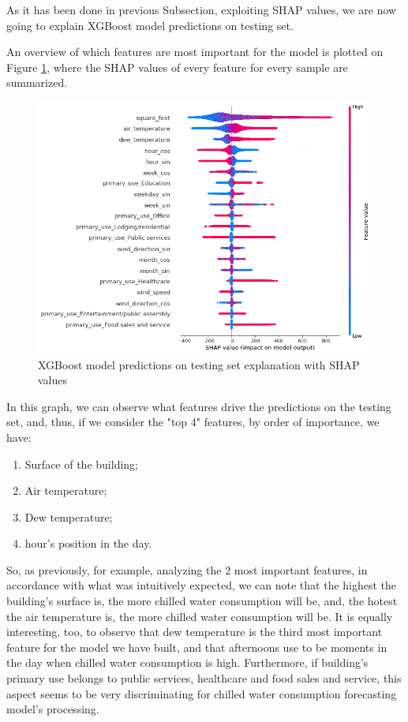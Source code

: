 \documentclass[twocolumn, switch]{article}
\begin{document}
As it has been done in previous Subsection, exploiting SHAP values, we are now going to explain XGBoost model predictions on testing set.

An overview of which features are most important for the model is plotted on Figure \ref{fig:shap_values_summary_plot_chilled_water}, where the SHAP values of every feature for every sample are summarized.

\begin{figure}[H]
\centering
\includegraphics[scale=0.3]{../graphs/shap_values_summary_plot_chilled_water}
\caption{XGBoost model predictions on testing set explanation with SHAP values}
\label{fig:shap_values_summary_plot_chilled_water}
\end{figure}

In this graph, we can observe what features drive the predictions on the testing set, and, thus, if we consider the "top 4" features, by order of importance, we have:

\begin{enumerate}
\item Surface of the building;
\item Air temperature;
\item Dew temperature;
\item hour's position in the day.
\end{enumerate}

So, as previously, for example, analyzing the $2$ most important features, in accordance with what was intuitively expected, we can note that the highest the building's surface is, the more chilled water consumption will be, and, the hotest the air temperature is, the more chilled water consumption will be. It is equally interesting, too, to observe that dew temperature is the third most important feature for the model we have built, and that afternoons use to be moments in the day when chilled water consumption is high. Furthermore, if building's primary use belongs to public services, healthcare and food sales and service, this aspect seems to be very discriminating for chilled water consumption forecasting model's processing.
\end{document}
